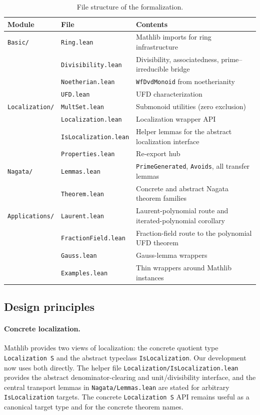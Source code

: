 \documentclass[11pt]{article}
\theoremstyle{plain}
\theoremstyle{definition}
\theoremstyle{remark}
\newcommand{\li}[1]{\texorpdfstring{\texttt{#1}}{#1}}
\newcommand{\lf}[1]{\texorpdfstring{\nolinkurl{#1}}{#1}}
\begin{document}
\begin{table}[ht]
\centering
\caption{File structure of the formalization.}\label{tab:files}
\smallskip
\begin{tabular}{@{}llp{7.2cm}@{}}
\toprule
\textbf{Module} & \textbf{File} & \textbf{Contents} \\
\midrule
\texttt{Basic/}
  & \texttt{Ring.lean}
  & Mathlib imports for ring infrastructure \\
  & \texttt{Divisibility.lean}
  & Divisibility, associatedness, prime--irreducible bridge \\
  & \texttt{Noetherian.lean}
  & \li{WfDvdMonoid} from noetherianity \\
  & \texttt{UFD.lean}
  & UFD characterization \\
\midrule
\texttt{Localization/}
  & \texttt{MultSet.lean}
  & Submonoid utilities (zero exclusion) \\
  & \texttt{Localization.lean}
  & Localization wrapper API \\
  & \texttt{IsLocalization.lean}
  & Helper lemmas for the abstract localization interface \\
  & \texttt{Properties.lean}
  & Re-export hub \\
\midrule
\texttt{Nagata/}
  & \texttt{Lemmas.lean}
  & \li{PrimeGenerated}, \li{Avoids}, all transfer lemmas \\
  & \texttt{Theorem.lean}
  & Concrete and abstract Nagata theorem families \\
\midrule
\texttt{Applications/}
  & \texttt{Laurent.lean}
  & Laurent-polynomial route and iterated-polynomial corollary \\
  & \texttt{FractionField.lean}
  & Fraction-field route to the polynomial UFD theorem \\
  & \texttt{Gauss.lean}
  & Gauss-lemma wrappers \\
  & \texttt{Examples.lean}
  & Thin wrappers around Mathlib instances \\
\bottomrule
\end{tabular}
\end{table}

\subsection{Design principles}

\paragraph{Concrete localization.}
Mathlib provides two views of localization: the concrete quotient type
\li{Localization\,S} and the abstract typeclass \li{IsLocalization}.  Our
development now uses both directly.  The helper file
\lf{Localization/IsLocalization.lean} provides the abstract denominator-clearing
and unit/divisibility interface, and the central transport lemmas in
\lf{Nagata/Lemmas.lean} are stated for arbitrary \li{IsLocalization} targets.
The concrete \li{Localization\,S} API remains useful as a canonical target type
and for the concrete theorem names.
\end{document}
